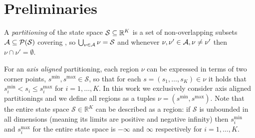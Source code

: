 \section {Preliminaries}%
\label {sec:preliminaries}




\begin {definition}%
\label {def:partitioning}
  A \emph {partitioning} \Partition of the state space \( \mathcal S \subseteq
  \mathbb R ^K \) is a set of non-overlapping subsets \( \mathcal A \subseteq
  \mathcal P (\mathcal S) \) covering \SSpace, so \( \bigcup _{\nu \in \mathcal A}
  \nu = \mathcal S \) and whenever \( \nu, \nu' \in \mathcal A, \nu \neq \nu'  \)
  then \( \nu \cap \nu' = \emptyset \).
\end {definition}


For an \textit{axis aligned} partitioning, each region $\nu$ can be expressed in
terms of two corner points, $s^{\min}, s^{\max} \in \mathcal{S}$, so that for
each $s = (s_1, \ldots, s_K) \in \nu$ it holds that $s^{\min}_i < s_i \le
s^{\max}_i$ for $i = 1,\ldots,K$. In this work we exclusively consider axis
aligned partitionings and we define all regions as a tuples $\nu = (s^{\min},
s^{\max})$. Note that the entire state space $\mathcal{S} \in \mathbb{R}^K$ can
be described as a region: if $\mathcal{S}$ is unbounded in all dimensions
(meaning its limits are positive and negative infinity) then $s^{\min}_i$ and
$s^{\max}_i$ for the entire state space is $-\infty$ and $\infty$ respectively
for $i = 1,\ldots,K$.



